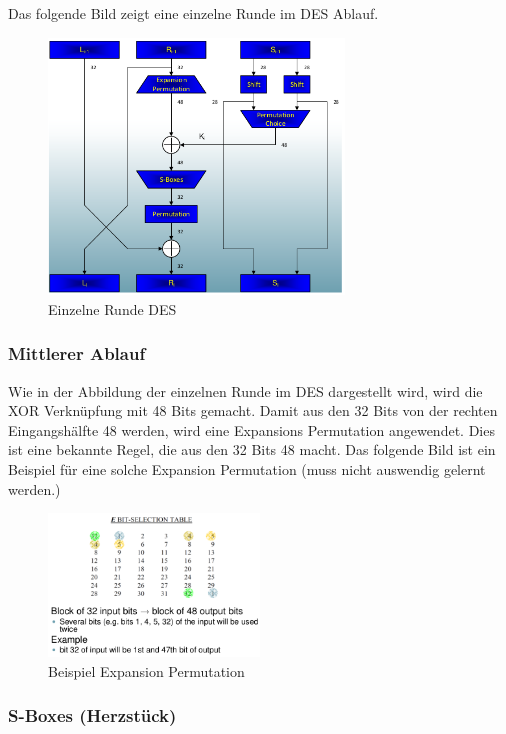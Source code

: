 Das folgende Bild zeigt eine einzelne Runde im DES Ablauf.

\begin{figure}[H]
\centering
\includegraphics[width=0.7\textwidth]{figures/singleRoundDES.png}
\caption{Einzelne Runde DES}
\end{figure}

\hypertarget{mittlerer-ablauf}{%
\subsubsection{Mittlerer Ablauf}\label{mittlerer-ablauf}}

Wie in der Abbildung der einzelnen Runde im DES dargestellt wird, wird
die XOR Verknüpfung mit 48 Bits gemacht. Damit aus den 32 Bits von der
rechten Eingangshälfte 48 werden, wird eine Expansions Permutation
angewendet. Dies ist eine bekannte Regel, die aus den 32 Bits 48 macht.
Das folgende Bild ist ein Beispiel für eine solche Expansion Permutation
(muss nicht auswendig gelernt werden.)

\begin{figure}[H]
\centering
\includegraphics[width=0.5\textwidth]{figures/expansionPermutation.png}
\caption{Beispiel Expansion Permutation}
\end{figure}

\clearpage
\hypertarget{s-boxes-herzstuxfcck}{%
\subsubsection{S-Boxes (Herzstück)}\label{s-boxes-herzstuxfcck}}

